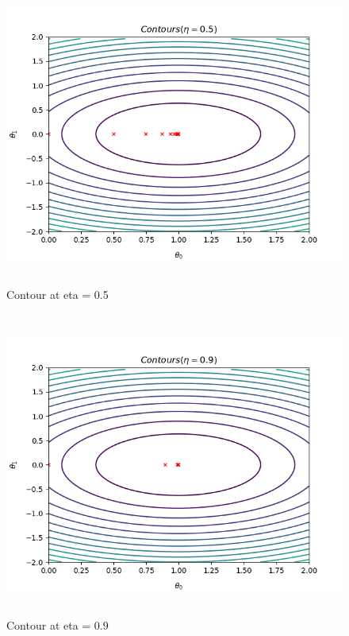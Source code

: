 \documentclass[10pt]{article}
\begin{document}
\begin{figure}[H]
	\includegraphics[width = 15cm,height = 10cm]{Q1_d05}
	\caption{Contour at eta = 0.5}
\end{figure}

\begin{figure}[H]
	\includegraphics[width = 15cm,height = 10cm]{Q1_d09}
	\caption{Contour at eta = 0.9}
\end{figure}
\end{document}
